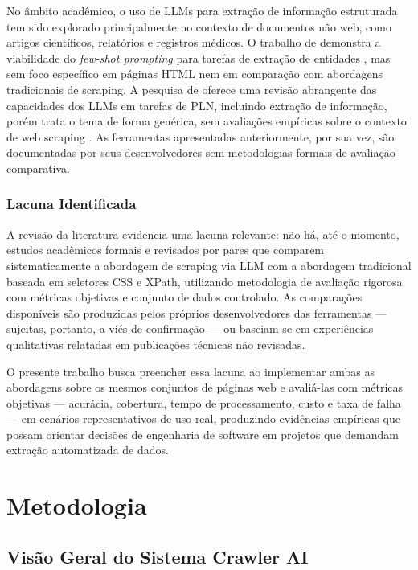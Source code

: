 \documentclass[tcc,capa]{texifsul}
\begin{document}
No âmbito acadêmico, o uso de LLMs para extração de informação estruturada tem sido explorado principalmente no contexto de documentos não web, como artigos científicos, relatórios e registros médicos. O trabalho de \citeauthor{Brown2020} demonstra a viabilidade do \textit{few-shot prompting} para tarefas de extração de entidades \cite{Brown2020}, mas sem foco específico em páginas HTML nem em comparação com abordagens tradicionais de scraping. A pesquisa de \citeauthor{Zhao2023} oferece uma revisão abrangente das capacidades dos LLMs em tarefas de PLN, incluindo extração de informação, porém trata o tema de forma genérica, sem avaliações empíricas sobre o contexto de web scraping \cite{Zhao2023}. As ferramentas apresentadas anteriormente, por sua vez, são documentadas por seus desenvolvedores sem metodologias formais de avaliação comparativa.

\subsection*{Lacuna Identificada}

A revisão da literatura evidencia uma lacuna relevante: não há, até o momento, estudos acadêmicos formais e revisados por pares que comparem sistematicamente a abordagem de scraping via LLM com a abordagem tradicional baseada em seletores CSS e XPath, utilizando metodologia de avaliação rigorosa com métricas objetivas e conjunto de dados controlado. As comparações disponíveis são produzidas pelos próprios desenvolvedores das ferramentas — sujeitas, portanto, a viés de confirmação — ou baseiam-se em experiências qualitativas relatadas em publicações técnicas não revisadas.

O presente trabalho busca preencher essa lacuna ao implementar ambas as abordagens sobre os mesmos conjuntos de páginas web e avaliá-las com métricas objetivas — acurácia, cobertura, tempo de processamento, custo e taxa de falha — em cenários representativos de uso real, produzindo evidências empíricas que possam orientar decisões de engenharia de software em projetos que demandam extração automatizada de dados.

\chapter{Metodologia}
\label{cap:metodologia}

\section{Visão Geral do Sistema Crawler AI}
\end{document}
